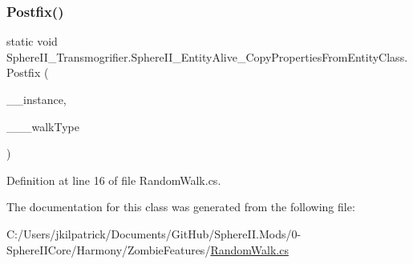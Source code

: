 \subsubsection{\texorpdfstring{Postfix()}{Postfix()}}
{\footnotesize\ttfamily static void Sphere\+I\+I\+\_\+\+Transmogrifier.\+Sphere\+I\+I\+\_\+\+Entity\+Alive\+\_\+\+Copy\+Properties\+From\+Entity\+Class.\+Postfix (\begin{DoxyParamCaption}\item[{Entity\+Alive}]{\+\_\+\+\_\+instance,  }\item[{ref int}]{\+\_\+\+\_\+\+\_\+walk\+Type }\end{DoxyParamCaption})\hspace{0.3cm}{\ttfamily [static]}}



Definition at line 16 of file Random\+Walk.\+cs.



The documentation for this class was generated from the following file\+:\begin{DoxyCompactItemize}
\item 
C\+:/\+Users/jkilpatrick/\+Documents/\+Git\+Hub/\+Sphere\+I\+I.\+Mods/0-\/\+Sphere\+I\+I\+Core/\+Harmony/\+Zombie\+Features/\mbox{\hyperlink{_random_walk_8cs}{Random\+Walk.\+cs}}\end{DoxyCompactItemize}
